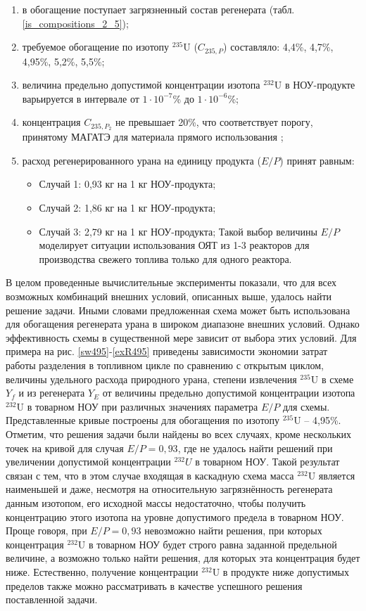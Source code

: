 \begin{enumerate}
    \item в обогащение поступает загрязненный состав регенерата (табл. \ref{is_compositions_2_5}); 
    \item требуемое обогащение по изотопу $^{235}$U ($C_{235,P}$) составляло: 4,4\%, 4,7\%, 4,95\%, 5,2\%, 5,5\%;    
    \item величина предельно допустимой концентрации изотопа $^{232}$U в НОУ-продукте варьируется в интервале от $1\cdot10^{-7}$\% до $1\cdot10^{-6}$\%;
    \item концентрация $C_{235,{P_2}}$ не превышает 20\%, что соответствует порогу, принятому МАГАТЭ для материала прямого использования \cite{alekseevConceptUseRecycled2010};
    \item расход регенерированного урана на единицу продукта ($E/P$) принят равным:
    \begin{itemize}
        \item Случай 1: 0,93 кг на 1 кг НОУ-продукта;
        \item Случай 2: 1,86 кг на 1 кг НОУ-продукта;
        \item Случай 3: 2,79 кг на 1 кг НОУ-продукта;
        Такой выбор величины $E/P$ моделирует ситуации использования ОЯТ из 1-3 реакторов для производства свежего топлива только для одного реактора.
    \end{itemize}
\end{enumerate}

В целом проведенные вычислительные эксперименты показали, что для всех возможных комбинаций внешних условий, описанных выше, удалось найти решение задачи. Иными словами предложенная схема может быть использована для обогащения регенерата урана в широком диапазоне внешних условий. Однако эффективность схемы в существенной мере зависит от выбора этих условий. Для примера на рис. \ref{sw495}-\ref{exR495} приведены зависимости экономии затрат работы разделения в топливном цикле по сравнению с открытым циклом, величины удельного расхода природного урана, степени извлечения $^{235}$U в схеме $Y_f$ и из регенерата $Y_{E}$ от величины предельно допустимой концентрации изотопа $^{232}$U в товарном НОУ при различных значениях параметра $E/P$ для схемы. Представленные кривые построены для обогащения по изотопу $^{235}$U -- 4,95\%. Отметим, что решения задачи были найдены во всех случаях, кроме нескольких точек на кривой для случая $E/P=0,93$, где не удалось найти решений при увеличении допустимой концентрации $^{232}U$ в товарном НОУ. Такой результат связан с тем, что в этом случае входящая в каскадную схема масса $^{232}$U является наименьшей и даже, несмотря на относительную загрязнённость регенерата данным изотопом, его исходной массы недостаточно, чтобы получить концентрацию этого изотопа на  уровне допустимого предела в товарном НОУ. Проще говоря, при $E/P=0,93$ невозможно найти решения, при которых концентрация $^{232}$U в товарном НОУ будет строго равна заданной предельной величине, а возможно только найти решения, для которых эта концентрация будет ниже. Естественно, получение концентрации $^{232}$U в продукте ниже допустимых пределов также можно рассматривать в качестве успешного решения поставленной задачи.


